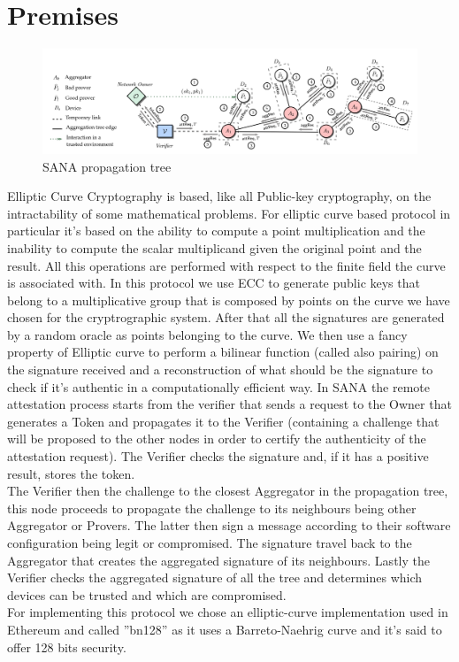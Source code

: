 \documentclass[10pt, a4paper, twocolumn]{article} %
\begin{document}
 
\section{Premises}

\begin{figure}
	\includegraphics[width=\linewidth]{images/SANA_general.png} %
	\caption{SANA propagation tree} %
	\label{bear} %
\end{figure}

Elliptic Curve Cryptography is based, like all Public-key cryptography, on the intractability of some mathematical problems.
For elliptic curve based protocol in particular it's based on the ability to compute a point multiplication and the inability to compute the scalar multiplicand given the original point and the result.
All this operations are performed with respect to the finite field the curve is associated with.
In this protocol we use ECC to generate public keys that belong to a multiplicative group that is composed by points on the curve we have chosen for the cryptrographic system.
After that all the signatures are generated by a random oracle as points belonging to the curve. We then use a fancy property of Elliptic curve to perform a bilinear function (called also pairing) on the signature received and a reconstruction of what should be the signature to check if it's authentic in a computationally efficient way.
In SANA the remote attestation process starts from the verifier that sends a request to the Owner that generates a Token and propagates it to the Verifier (containing a challenge that will be proposed to the other nodes in order to certify the authenticity of the attestation request). The Verifier checks the signature and, if it has a positive result, stores the token. \\The Verifier then
the challenge to the closest Aggregator in the propagation tree, this node proceeds to propagate the challenge to its neighbours being other Aggregator
or Provers. The latter then sign a message according to their software configuration being legit or compromised. The signature travel back to the Aggregator
that creates the aggregated signature of its neighbours. Lastly the Verifier checks the aggregated signature of all the tree and determines which devices
can be trusted and which are compromised.\\
For implementing this protocol we chose an elliptic-curve implementation used in Ethereum and called ''bn128'' as it uses a Barreto-Naehrig curve and it's said to offer 128 bits security.
\end{document}
